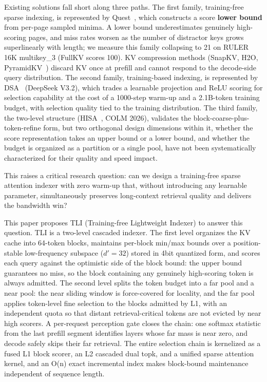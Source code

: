 \documentclass[11pt]{article}
\begin{document}
Existing solutions fall short along three paths. The first family, training-free sparse indexing, is represented by Quest~\cite{quest}, which constructs a score \textbf{lower bound} from per-page sampled minima. A lower bound underestimates genuinely high-scoring pages, and miss rates worsen as the number of distractor keys grows superlinearly with length; we measure this family collapsing to 21 on RULER 16K multikey\_3 (FullKV scores 100). KV compression methods (SnapKV, H2O, PyramidKV~\cite{snapkv,h2o,pyramidkv}) discard KV once at prefill and cannot respond to the decode-side query distribution. The second family, training-based indexing, is represented by DSA~\cite{dsa} (DeepSeek V3.2), which trades a learnable projection and ReLU scoring for selection capability at the cost of a 1000-step warm-up and a 2.1B-token training budget, with selection quality tied to the training distribution. The third family, the two-level structure (HISA~\cite{hisa}, COLM 2026), validates the block-coarse-plus-token-refine form, but two orthogonal design dimensions within it, whether the score representation takes an upper bound or a lower bound, and whether the budget is organized as a partition or a single pool, have not been systematically characterized for their quality and speed impact.

This raises a critical research question: can we design a training-free sparse attention indexer with zero warm-up that, without introducing any learnable parameter, simultaneously preserves long-context retrieval quality and delivers the bandwidth win?

This paper proposes TLI (Training-free Lightweight Indexer) to answer this question. TLI is a two-level cascaded indexer. The first level organizes the KV cache into 64-token blocks, maintains per-block min/max bounds over a position-stable low-frequency subspace ($d'{=}32$) stored in 4bit quantized form, and scores each query against the optimistic side of the block bound: the upper bound guarantees no miss, so the block containing any genuinely high-scoring token is always admitted. The second level splits the token budget into a far pool and a near pool: the near sliding window is force-covered for locality, and the far pool applies token-level fine selection to the blocks admitted by L1, with an independent quota so that distant retrieval-critical tokens are not evicted by near high scorers. A per-request perception gate closes the chain: one softmax statistic from the last prefill segment identifies layers whose far mass is near zero, and decode safely skips their far retrieval. The entire selection chain is kernelized as a fused L1 block scorer, an L2 cascaded dual topk, and a unified sparse attention kernel, and an O(n) exact incremental index makes block-bound maintenance independent of sequence length.
\end{document}
